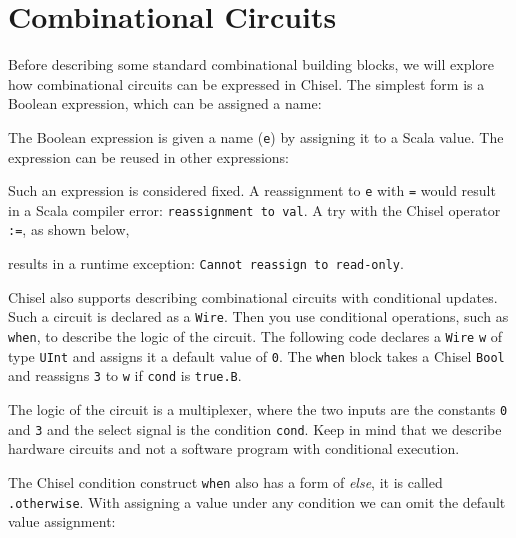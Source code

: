 \documentclass[%
    10pt,
    headinclude, footexclude,
    openright, %
    notitlepage,
    cleardoubleempty,
    headsepline,
    pointlessnumbers,
    bibtotoc, idxtotoc,
    ]{scrbook}
\newcommand{\code}[1]{{\small{\texttt{#1}}}}
\begin{document}
\section{Combinational Circuits}


Before describing some standard combinational building blocks, we will explore
how combinational circuits can be expressed in Chisel.
The simplest form is a Boolean expression, which can be assigned a name:


\noindent The Boolean expression is given a name (\code{e}) by assigning it
to a Scala value. The expression can be reused in other expressions:


Such an expression is considered fixed. A reassignment to \code{e}
with \code{=} would result in a Scala compiler error: \code{reassignment to val}.
A try with the Chisel operator \code{:=}, as shown below,


\noindent results in a runtime exception: \code{Cannot reassign to read-only}.

Chisel also supports describing combinational circuits with conditional updates.
Such a circuit is declared as a \code{Wire}. Then you use conditional operations,
such as \code{when}, to describe the logic of the circuit.
The following code declares a \code{Wire} \code{w} of type \code{UInt} and assigns it a default
value of \code{0}. The \code{when} block takes a Chisel \code{Bool} and reassigns
\code{3} to \code{w} if \code{cond} is \code{true.B}.


\noindent The logic of the circuit is a multiplexer, where the two inputs are the constants
\code{0} and \code{3} and the select signal is the condition \code{cond}.
Keep in mind that we describe hardware circuits and not a software program with conditional
execution.

The Chisel condition construct \code{when} also has a form of \emph{else}, it is called
\code{.otherwise}. With assigning a value under any condition we can omit the default
value assignment:


\end{document}
